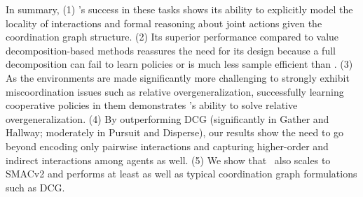 In summary, (1) \algoabb's success in these tasks shows its ability to explicitly model the locality of interactions and formal reasoning about joint actions given the coordination graph structure. (2) Its superior performance compared to value decomposition-based methods reassures the need for its design because a full decomposition can fail to learn policies or is much less sample efficient than \algoabb. (3) As the environments are made significantly more challenging to strongly exhibit miscoordination issues such as relative overgeneralization, successfully learning cooperative policies in them demonstrates \algoabb's ability to solve relative overgeneralization. (4) By outperforming DCG (significantly in Gather and Hallway; moderately in Pursuit and Disperse), our results show the need to go beyond encoding only pairwise interactions and capturing higher-order and indirect interactions among agents as well. (5) We show that \algoabb\ also scales to SMACv2 and performs at least as well as typical coordination graph formulations such as DCG. 

